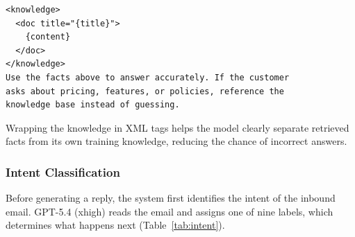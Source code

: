 \documentclass[a4paper]{article}
\begin{document}
\begin{tcolorbox}[
  enhanced,
  colback      = gray!4,
  colframe     = blue!35,
  arc          = 5pt,
  boxrule      = 0.7pt,
  title        = {\small\bfseries Listing~\ref{lst:xmlblock}: Knowledge block injected into each prompt},
  fonttitle    = \small\bfseries,
  colbacktitle = blue!35,
  coltitle     = white,
]
\begin{Verbatim}[fontsize=\small]
<knowledge>
  <doc title="{title}">
    {content}
  </doc>
</knowledge>
Use the facts above to answer accurately. If the customer
asks about pricing, features, or policies, reference the
knowledge base instead of guessing.
\end{Verbatim}
\end{tcolorbox}
\label{lst:xmlblock}

Wrapping the knowledge in XML tags helps the model clearly separate retrieved
facts from its own training knowledge, reducing the chance of incorrect answers.

\subsubsection{Intent Classification}
\label{sec:intent-classification}
Before generating a reply, the system first identifies the intent of the inbound
email. GPT-5.4 (xhigh) reads the email and assigns one of nine labels, which
determines what happens next (Table~\ref{tab:intent}).
\end{document}
